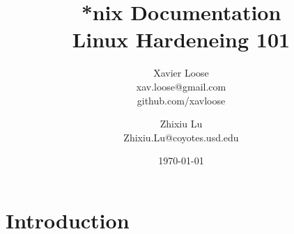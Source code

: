 \documentclass[11pt, letterpaper, oneside, titlepage]{article}
\title{*nix Documentation \\\large Linux Hardeneing 101}
\author{ Xavier Loose \\ xav.loose@gmail.com \\ github.com/xavloose \and Zhixiu Lu \\ Zhixiu.Lu@coyotes.usd.edu }
\date{\today}
\begin{document}

  \maketitle
  \part{Introduction}
    
    \newpage
\end{document}
